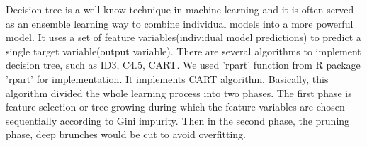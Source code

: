 \documentclass{edm_template}
\begin{document}
Decision tree is a well-know technique in machine learning and it is often served as an ensemble learning way to combine individual models into a more powerful model. It uses a set of feature variables(individual model predictions) to predict a single target variable(output variable). There are several algorithms to implement decision tree, such as ID3\cite{quinlan1986induction}, C4.5\cite{quinlan1993c4}, CART\cite{breiman1984classification}. We used 'rpart' function from R package 'rpart'\cite{therneau2015rpart} for implementation. It implements CART algorithm. Basically, this algorithm divided the whole learning process into two phases. The first phase is feature selection or tree growing during which the feature variables are chosen sequentially according to Gini impurity\cite{murphy2012machine}. Then in the second phase, the pruning phase, deep brunches would be cut to avoid overfitting. 
\end{document}
